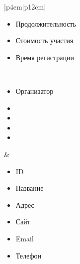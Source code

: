 \begin{table}[h!]
\begin{center}
\begin{threeparttable}
\begin{tabular}{|p{4cm}|p{12cm}|}
\begin{minipage}[t]{\linewidth}
\begin{multicols}{2}
\begin{itemize}[leftmargin=0mm,labelsep=0mm,nosep,after=\strut]
                  \item[] Продолжительность
                  \item[] Стоимость участия
                  \item[] Время регистрации
                \end{itemize}
              \end{multicols}
            \end{minipage}\\
            \hline
            \begin{minipage}[t]{\linewidth}
              \begin{multicols}{1}
                \begin{itemize}[leftmargin=0mm,labelsep=0mm,nosep,after=\strut]
                  \item[] Организатор
                  \item[]
                  \item[]
                  \item[]
                  \item[]
                \end{itemize}
              \end{multicols}
            \end{minipage}
          & \begin{minipage}[t]{\linewidth}
              \begin{multicols}{2}
                \begin{itemize}[leftmargin=0mm,labelsep=0mm,nosep,after=\strut]
                  \item[] ID
                  \item[] Название
                  \item[] Адрес
                  \item[] Сайт
                  \item[] Email
                  \item[] Телефон
                \end{itemize}
              \end{multicols}
            \end{minipage}\\
            \hline
            \begin{minipage}[t]{\linewidth}
              \begin{multicols}{1}
                \begin{itemize}[leftmargin=0mm,labelsep=0mm,nosep,after=\strut]

\end{itemize}
\end{multicols}
\end{minipage}
\end{tabular}
\end{threeparttable}
\end{center}
\end{table}
